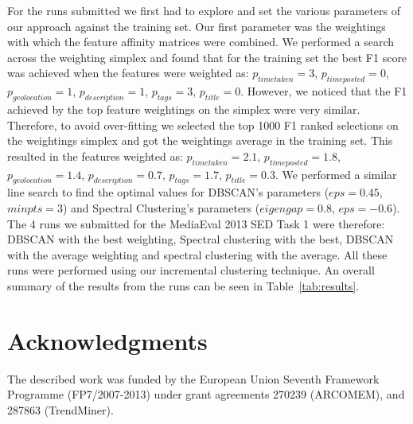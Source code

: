 \documentclass{../acm_proc_article-me11_tweaked}
\begin{document}
For the runs submitted we first had to explore and set the various parameters of our approach against the training set. Our first parameter was the weightings with which the feature affinity matrices were combined. We performed a search across the weighting simplex and found that for the training set the best F1 score was achieved when the features were weighted as: $p_{timetaken}=3$, $p_{timeposted}=0$, $p_{geolocation}=1$, $p_{description}=1$, $p_{tags}=3$, $p_{title}=0$. However, we noticed that the F1 achieved by the top feature weightings on the simplex were very similar. Therefore, to avoid over-fitting we selected the top 1000 F1 ranked selections on the weightings simplex and got the weightings average in the training set. This resulted in the features weighted as: $p_{timetaken}=2.1$, $p_{timeposted}=1.8$, $p_{geolocation}=1.4$, $p_{description}=0.7$, $p_{tags}=1.7$, $p_{title}=0.3$. We performed a similar line search to find the optimal values for DBSCAN's parameters ($eps=0.45$, $minpts=3$) and Spectral Clustering's parameters ($eigengap=0.8$, $eps=-0.6$). The 4 runs we submitted for the MediaEval 2013 SED Task 1 were therefore: DBSCAN with the best weighting, Spectral clustering with the best, DBSCAN with the average weighting and spectral clustering with the average. All these runs were performed using our incremental clustering technique. An overall summary of the results from the runs can be seen in Table~\ref{tab:results}.

\section{Acknowledgments}
The described work was funded by the European Union Seventh Framework Programme (FP7/2007-2013) under grant agreements 270239 (ARCOMEM), and 287863 (TrendMiner).



\end{document}
